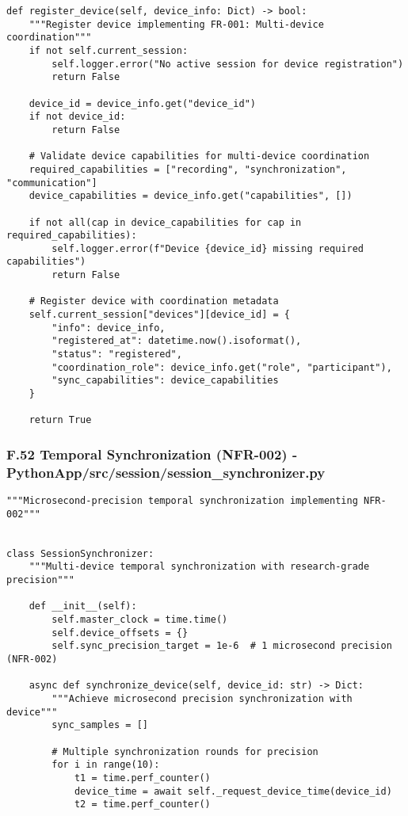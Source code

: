 \documentclass[12pt,a4paper]{report}
\begin{document}
{{\begin{verbatim}
def register_device(self, device_info: Dict) -> bool:
    """Register device implementing FR-001: Multi-device coordination"""
    if not self.current_session:
        self.logger.error("No active session for device registration")
        return False

    device_id = device_info.get("device_id")
    if not device_id:
        return False

    # Validate device capabilities for multi-device coordination
    required_capabilities = ["recording", "synchronization", "communication"]
    device_capabilities = device_info.get("capabilities", [])

    if not all(cap in device_capabilities for cap in required_capabilities):
        self.logger.error(f"Device {device_id} missing required capabilities")
        return False

    # Register device with coordination metadata
    self.current_session["devices"][device_id] = {
        "info": device_info,
        "registered_at": datetime.now().isoformat(),
        "status": "registered",
        "coordination_role": device_info.get("role", "participant"),
        "sync_capabilities": device_capabilities
    }

    return True
\end{verbatim}

\subsubsection{F.52 Temporal Synchronization (NFR-002) - PythonApp/src/session/session_synchronizer.py}

\begin{verbatim}
"""Microsecond-precision temporal synchronization implementing NFR-002"""


class SessionSynchronizer:
    """Multi-device temporal synchronization with research-grade precision"""

    def __init__(self):
        self.master_clock = time.time()
        self.device_offsets = {}
        self.sync_precision_target = 1e-6  # 1 microsecond precision (NFR-002)

    async def synchronize_device(self, device_id: str) -> Dict:
        """Achieve microsecond precision synchronization with device"""
        sync_samples = []

        # Multiple synchronization rounds for precision
        for i in range(10):
            t1 = time.perf_counter()
            device_time = await self._request_device_time(device_id)
            t2 = time.perf_counter()


\end{verbatim}}}
\end{document}
